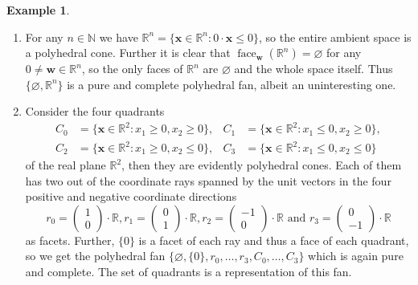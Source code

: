 \documentclass[
  paper=a4,
  titlepage,
  bibliography=totoc,
  listof=totoc,
  pagesize=pdftex
]{scrartcl}
\numberwithin{figure}{section}
\numberwithin{equation}{section}
\numberwithin{table}{section}
\newcommand*\setR{\mathds{R}}
\newcommand*\setN{\mathds{N}}
\newcommand*\vectRR[2]{\begin{pmatrix} #1 \\ #2 \end{pmatrix}}
\let\vec\mathbf
\DeclareMathOperator{\face}{face}
\theoremstyle{definition}
\newtheorem{example}[definition]{Example}
\numberwithin{definition}{section}
\begin{document}
\begin{example}\
  \begin{enumerate}
    \item For any $n \in \setN$ we have $\setR^n = \{ \vec x \in \setR^n : 0 \cdot \vec x
      \leq 0 \}$, so the entire ambient space is a polyhedral cone. Further it is clear
      that $\face_{\vec w}(\setR^n) = \varnothing$ for any $0\neq\vec w \in \setR^n$, so
      the only faces of $\setR^n$ are $\varnothing$ and the whole space itself. Thus $\{
      \varnothing, \setR^n\}$ is a pure and complete polyhedral fan, albeit an
      uninteresting one.
    \item Consider the four quadrants
      \begin{align*}
        C_0 &= \{ \vec x \in \setR^2 : x_1 \geq 0, x_2 \geq 0 \}, &
        C_1 &= \{ \vec x \in \setR^2 : x_1 \leq 0, x_2 \geq 0 \}, \\
        C_2 &= \{ \vec x \in \setR^2 : x_1 \geq 0, x_2 \leq 0 \}, &
        C_3 &= \{ \vec x \in \setR^2 : x_1 \leq 0, x_2 \leq 0 \}
      \end{align*}
      of the real plane $\setR^2$, then they are evidently polyhedral cones. Each of them
      has two out of the coordinate rays spanned by the unit vectors in the four positive
      and negative coordinate directions
      \[
        r_0 = \vectRR10 \cdot \setR,
        r_1 = \vectRR01 \cdot \setR,
        r_2 = \vectRR{-1}0 \cdot \setR
        \text{ and }
        r_3 = \vectRR0{-1} \cdot \setR
      \]
      as facets. Further, $\{0\}$ is a facet of each ray and thus a face of each quadrant,
      so we get the polyhedral fan $\{ \varnothing, \{0\}, r_0, \dots, r_3, C_0, \dots,
      C_3 \}$ which is again pure and complete. The set of quadrants is a representation
      of this fan.
  \end{enumerate}
\end{example}
\end{document}
